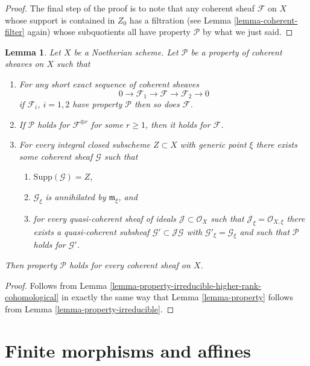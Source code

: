 \documentclass{stacks-project}
\theoremstyle{plain}
\newtheorem{lemma}[subsection]{Lemma}
\theoremstyle{definition}
\theoremstyle{remark}
\numberwithin{equation}{subsection}
\begin{document}
\begin{proof}
\medskip\noindent
The final step of the proof is to note that any coherent sheaf
$\mathcal{F}$ on $X$ whose support is contained in $Z_0$ has a filtration
(see Lemma \ref{lemma-coherent-filter} again) whose subquotients
all have property $\mathcal{P}$ by what we just said.
\end{proof}

\begin{lemma}
\label{lemma-property-higher-rank-cohomological}
Let $X$ be a Noetherian scheme.
Let $\mathcal{P}$ be a property of coherent sheaves on $X$ such that
\begin{enumerate}
\item For any short exact sequence of coherent sheaves
$$
0 \to \mathcal{F}_1 \to \mathcal{F} \to \mathcal{F}_2 \to 0
$$
if $\mathcal{F}_i$, $i = 1, 2$ have property $\mathcal{P}$
then so does $\mathcal{F}$.
\item If $\mathcal{P}$ holds  for $\mathcal{F}^{\oplus r}$ for
some $r \geq 1$, then it holds for $\mathcal{F}$.
\item For every integral closed subscheme $Z \subset X$
with generic point $\xi$ there exists
some coherent sheaf $\mathcal{G}$ such that
\begin{enumerate}
\item $\text{Supp}(\mathcal{G}) = Z$,
\item $\mathcal{G}_\xi$ is annihilated by $\mathfrak m_\xi$, and
\item for every quasi-coherent sheaf of ideals
$\mathcal{J} \subset \mathcal{O}_X$ such that
$\mathcal{J}_\xi = \mathcal{O}_{X, \xi}$ there exists a quasi-coherent
subsheaf $\mathcal{G}' \subset \mathcal{J}\mathcal{G}$ with
$\mathcal{G}'_\xi = \mathcal{G}_\xi$ and such that
$\mathcal{P}$ holds for $\mathcal{G}'$.
\end{enumerate}
\end{enumerate}
Then property $\mathcal{P}$ holds for every coherent sheaf
on $X$.
\end{lemma}

\begin{proof}
Follows from Lemma \ref{lemma-property-irreducible-higher-rank-cohomological}
in exactly the same way that Lemma \ref{lemma-property} follows from
Lemma \ref{lemma-property-irreducible}.
\end{proof}








\section{Finite morphisms and affines}
\label{section-finite-affine}
\end{document}
